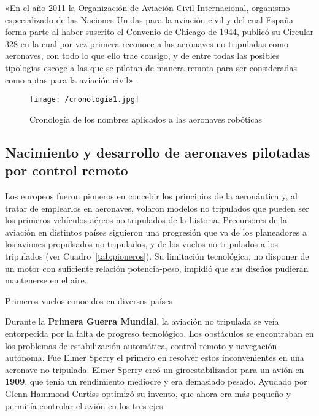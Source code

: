 «En el año 2011 la Organización de Aviación Civil Internacional, organismo especializado de las Naciones 
Unidas para la aviación civil y del cual España forma parte al haber suscrito el Convenio de Chicago de 1944, 
publicó su Circular 328 en la cual por vez primera reconoce a las aeronaves no tripuladas como aeronaves, 
con todo lo que ello trae consigo, y de entre todas las posibles tipologías escoge a las que se pilotan de manera 
remota para ser consideradas como aptas para la aviación civil» \cite{dron1}.

\begin{figure}[!h]
\begin{center}
\texttt{[image: /cronologia1.jpg]}
\caption[Caption]{Cronología de los nombres aplicados a las aeronaves robóticas\footnotemark}
\label{fig:cronologia}
\end{center}
\end{figure}


\subsection{Nacimiento y desarrollo de aeronaves pilotadas por control remoto}
\label{sec:historia}

Los europeos fueron pioneros en concebir los principios de la aeronáutica y, al 
tratar de emplearlos en aeronaves, volaron modelos no tripulados que pueden ser los primeros vehículos 
aéreos no tripulados de la historia. Precursores de la aviación en distintos países siguieron una progresión que va de los
planeadores a los aviones propulsados no tripulados, y de los vuelos no tripulados a los
tripulados (ver Cuadro~\ref{tab:pioneros}). Su limitación tecnológica, no disponer de un motor con suficiente relación potencia-peso, 
impidió que sus diseños pudieran mantenerse en el aire.

\begin{table}[htb]
  \centering
  {\small
  
  }
  \caption[Primeros vuelos conocidos en diversos países]
  {Primeros vuelos conocidos en diversos países \cite{dron1}}
  \label{tab:pioneros}
\end{table}

Durante la \textbf{Primera Guerra Mundial}, la aviación no tripulada se veía entorpecida por la falta de progreso tecnológico. 
Los obstáculos se encontraban en los problemas de estabilización automática, control remoto y navegación autónoma. Fue Elmer Sperry el primero en resolver estos inconvenientes en una aeronave no tripulada. Elmer Sperry creó un giroestabilizador para un avión en \textbf{1909}, que tenía un rendimiento mediocre y era demasiado pesado. Ayudado por Glenn Hammond Curtiss optimizó su invento, que ahora era 
más pequeño y permitía controlar el avión en los tres ejes.

